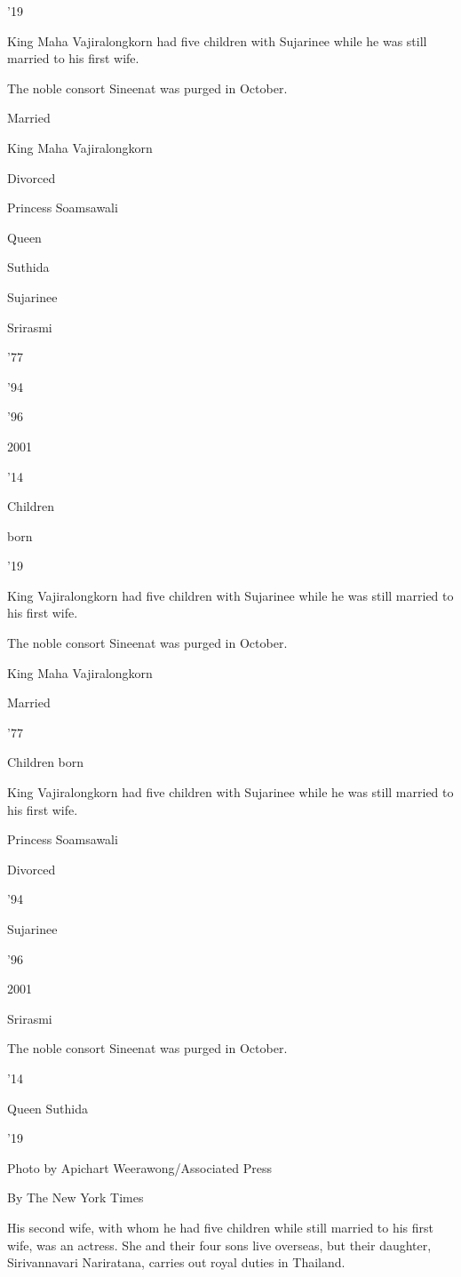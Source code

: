 '19

King Maha Vajiralongkorn had five children with Sujarinee while he was
still married to his first wife.

The noble consort Sineenat was purged in October.

Married

King Maha Vajiralongkorn

Divorced

Princess Soamsawali

Queen

Suthida

Sujarinee

Srirasmi

'77

'94

'96

2001

'14

Children

born

'19

King Vajiralongkorn had five children with Sujarinee while he was still
married to his first wife.

The noble consort Sineenat was purged in October.

King Maha Vajiralongkorn

Married

'77

Children born

King Vajiralongkorn had five children with Sujarinee while he was still
married to his first wife.

Princess Soamsawali

Divorced

'94

Sujarinee

'96

2001

Srirasmi

The noble consort Sineenat was purged in October.

'14

Queen Suthida

'19

Photo by Apichart Weerawong/Associated Press

By The New York Times

His second wife, with whom he had five children while still married to
his first wife, was an actress. She and their four sons live overseas,
but their daughter, Sirivannavari Nariratana, carries out royal duties
in Thailand.

